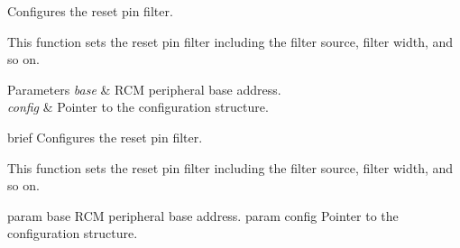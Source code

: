 Configures the reset pin filter. 

This function sets the reset pin filter including the filter source, filter width, and so on.


\begin{DoxyParams}{Parameters}
{\em base} & R\+CM peripheral base address. \\
\hline
{\em config} & Pointer to the configuration structure.\\
\hline
\end{DoxyParams}
brief Configures the reset pin filter.

This function sets the reset pin filter including the filter source, filter width, and so on.

param base R\+CM peripheral base address. param config Pointer to the configuration structure. 